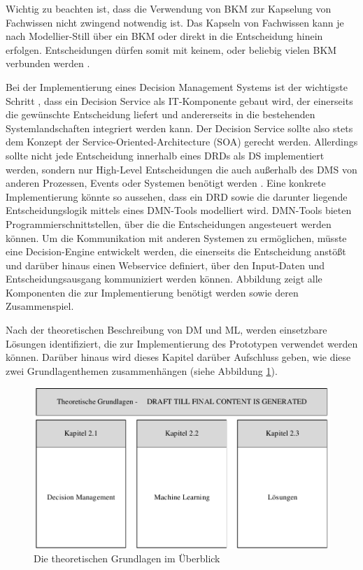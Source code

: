 Wichtig zu beachten ist, dass die Verwendung von BKM zur Kapselung von Fachwissen nicht zwingend notwendig ist. Das Kapseln von Fachwissen kann je nach Modellier-Still über ein BKM oder direkt in die Entscheidung hinein erfolgen. Entscheidungen dürfen somit mit keinem, oder beliebig vielen BKM verbunden werden \cite[vgl. S. 60]{OM16}.

Bei der Implementierung eines Decision Management Systems ist der wichtigste Schritt \cite[vgl. S. 115]{JT11}, dass ein Decision Service als IT-Komponente gebaut wird, der einerseits die gewünschte Entscheidung liefert und andererseits in die bestehenden Systemlandschaften integriert werden kann. Der Decision Service sollte also stets dem Konzept der Service-Oriented-Architecture (SOA) gerecht werden. Allerdings sollte nicht jede Entscheidung innerhalb eines DRDs als DS implementiert werden, sondern nur High-Level Entscheidungen die auch außerhalb des DMS von anderen Prozessen, Events oder Systemen benötigt werden \cite[vgl. S. 116]{JT11}. Eine konkrete Implementierung könnte so aussehen, dass ein DRD sowie die darunter liegende Entscheidungslogik mittels eines DMN-Tools modelliert wird. DMN-Tools bieten Programmierschnittstellen, über die die Entscheidungen angesteuert werden können. Um die Kommunikation mit anderen Systemen zu ermöglichen, müsste eine Decision-Engine \cite[vgl. S. 41]{BR16} entwickelt werden, die einerseits die Entscheidung anstößt und darüber hinaus einen Webservice definiert, über den Input-Daten und Entscheidungsausgang kommuniziert werden können. Abbildung zeigt alle Komponenten die zur Implementierung benötigt werden sowie deren Zusammenspiel.


Nach der theoretischen Beschreibung von DM und ML, werden einsetzbare Lösungen identifiziert,  die zur Implementierung des Prototypen verwendet werden können. Darüber hinaus wird dieses Kapitel darüber Aufschluss geben, wie diese zwei Grundlagenthemen zusammenhängen (siehe Abbildung \ref{fig:Grundlagenpic}).     

\begin{figure}[ht]
\centering
\includegraphics{images/grundlagentheo.pdf}
\caption{Die theoretischen Grundlagen im Überblick}
\label{fig:Grundlagenpic}
\end{figure}

